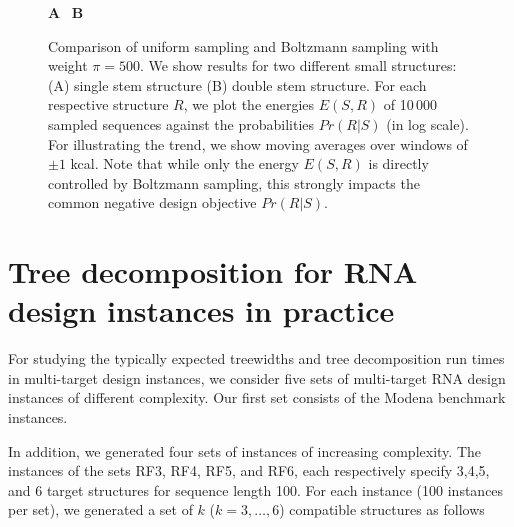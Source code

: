 \documentclass[10pt]{article}
\makeatletter
\newlength{\@aligneps}
\newcommand{\includegraphicstop}[2][]{%
\sbox{\@alignepsbox}{\texttt{[image: \#2]}}%
\setlength{\@aligneps}{-\ht\@alignepsbox}%
\addtolength{\@aligneps}{2ex}%
\raisebox{\@aligneps}{\usebox{\@alignepsbox}}}
\newcommand{\Def}[1]{\emph{#1}}
\makeatother
\begin{document}
% 

\begin{figure}[!h]
\textbf{A}~\includegraphicstop[width=0.48\textwidth]{Figs/Plots/stem_weight1-500_mean}%
\textbf{B}~\includegraphicstop[width=0.48\textwidth]{Figs/Plots/doublestem_weight1-500_mean}%
\caption{Comparison of uniform sampling and Boltzmann sampling with
weight $\pi=500$. We show results for two different small structures: (A) single stem structure (B) double stem structure. For each respective structure $R$, we plot the energies $E(S,R)$ of
10\,000 sampled sequences against the probabilities $Pr(R|S)$ (in log scale). For illustrating the trend, we show moving averages over windows of $\pm 1$ kcal. Note that while only the energy $E(S,R)$ is directly controlled by Boltzmann sampling, this strongly impacts the common negative design objective $Pr(R|S)$.}
\label{appfig:negforpos}
\end{figure}

\section{Tree decomposition for RNA design instances in practice}
\label{appsec:treedecomp}

For studying the typically expected treewidths and tree decomposition
run times in multi-target design instances, we consider five sets of
multi-target RNA design instances of different complexity. Our first
set consists of the Modena benchmark instances.

In addition, we generated four sets of instances of increasing
complexity. The instances of the sets RF3, RF4, RF5, and RF6, each
respectively specify 3,4,5, and 6 target structures for sequence
length 100.  For each instance (100 instances per set), we generated a
set of $k$ ($k=3,\dots,6$) compatible structures as follows
\end{document}
